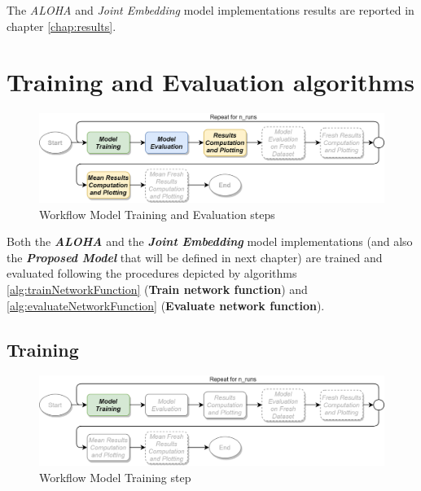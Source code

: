 \documentclass[pdfa%
,cucitura%
]{toptesi}
\begin{document}
The \textit{ALOHA} and \textit{Joint Embedding} model implementations results are reported in chapter \ref{chap:results}.

\section{Training and Evaluation algorithms}\label{sec:alohaAndJointEmbeddingTrainAndEvaluate}
\begin{figure}[h!]
	\centering
	\includegraphics[width=\textwidth]{./images/workflow_sorel.png}
	\caption[Training and evaluation workflow steps]{Workflow Model Training and Evaluation steps}
	\label{fig:workflow_train_eval_plot}
\end{figure}

Both the \textbf{\textit{ALOHA}} and the \textbf{\textit{Joint Embedding}} model implementations (and also the \textbf{\textit{Proposed Model}} that will be defined in next chapter) are trained and evaluated following the procedures depicted by algorithms \ref{alg:trainNetworkFunction} (\textbf{Train network function}) and \ref{alg:evaluateNetworkFunction} (\textbf{Evaluate network function}).

\subsection{Training}
\begin{figure}[h!]
	\centering
	\includegraphics[width=\textwidth]{./images/workflow_train.png}
	\caption[Training workflow step]{Workflow Model Training step}
	\label{fig:workflow_train}
\end{figure}
\end{document}
